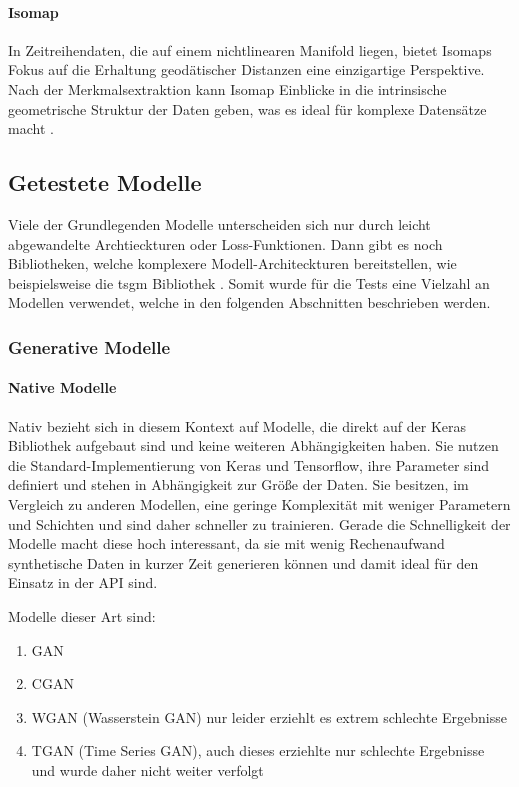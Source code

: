 \paragraph{\acf{Isomap}}
In Zeitreihendaten, die auf einem nichtlinearen Manifold liegen, bietet Isomaps Fokus auf die Erhaltung geodätischer Distanzen eine einzigartige Perspektive. 
Nach der Merkmalsextraktion kann Isomap Einblicke in die intrinsische geometrische Struktur der Daten geben, was es ideal für komplexe Datensätze macht \cite{7324314}.


\subsection{Getestete Modelle}
\label{sec:tested_models}
Viele der Grundlegenden Modelle unterscheiden sich nur durch leicht abgewandelte Archtieckturen oder Loss-Funktionen.
Dann gibt es noch Bibliotheken, welche komplexere Modell-Architeckturen bereitstellen, wie beispielsweise die tsgm Bibliothek \cite{nikitin2023tsgm}.
Somit wurde für die Tests eine Vielzahl an Modellen verwendet, welche in den folgenden Abschnitten beschrieben werden.

\subsubsection{Generative Modelle}
\label{sec:generative_models}
\paragraph{Native Modelle}
Nativ bezieht sich in diesem Kontext auf Modelle, die direkt auf der Keras Bibliothek aufgebaut sind und keine weiteren Abhängigkeiten haben. Sie nutzen die Standard-Implementierung von Keras und Tensorflow, ihre Parameter sind definiert und stehen in Abhängigkeit zur Größe der Daten.
Sie besitzen, im Vergleich zu anderen Modellen, eine geringe Komplexität mit weniger Parametern und Schichten und sind daher schneller zu trainieren.
Gerade die Schnelligkeit der Modelle macht diese hoch interessant, da sie mit wenig Rechenaufwand synthetische Daten in kurzer Zeit generieren können und damit ideal für den Einsatz in der \ac{API} sind.

Modelle dieser Art sind:    
\begin{enumerate}
    \item GAN
    \item CGAN
    \item WGAN (Wasserstein GAN) nur leider erziehlt es extrem schlechte Ergebnisse
    \item TGAN (Time Series GAN), auch dieses erziehlte nur schlechte Ergebnisse und wurde daher nicht weiter verfolgt
\end{enumerate}

